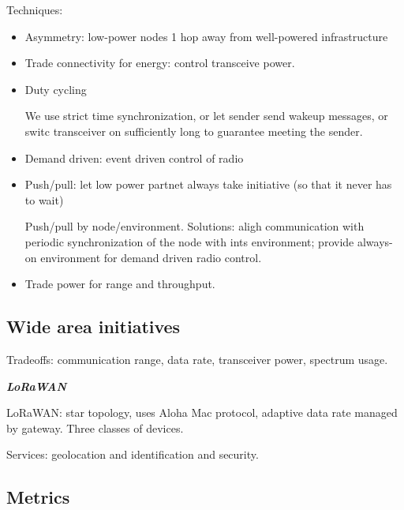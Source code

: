\documentclass[11pt]{article}
\let\oldemph\emph
\renewcommand{\emph}[1]{\oldemph{\textbf{#1}}\marginpar{\textbf{#1}}}
\begin{document}
    Techniques:
    \begin{itemize}
        \item Asymmetry: low-power nodes 1 hop away from well-powered infrastructure

        \item Trade connectivity for energy: control transceive power.
        \item Duty cycling

        We use strict time synchronization, or let sender send wakeup messages, or switc transceiver on sufficiently long to guarantee meeting the sender.

        \item Demand driven: event driven control of radio
        \item Push/pull: let low power partnet always take initiative (so that it never has to wait)

        Push/pull by node/environment.
        Solutions: aligh communication with periodic synchronization of the node with ints environment; provide always-on environment for demand driven radio control.

        \item Trade power for range and throughput.
    \end{itemize}

    \subsection{Wide area initiatives}

    Tradeoffs: communication range, data rate, transceiver power, spectrum usage.

    \emph{LoRaWAN}


    LoRaWAN: star topology, uses Aloha Mac protocol, adaptive data rate managed by gateway.
    Three classes of devices.

    Services: geolocation and identification and security.


    \subsection{Metrics}
\end{document}
